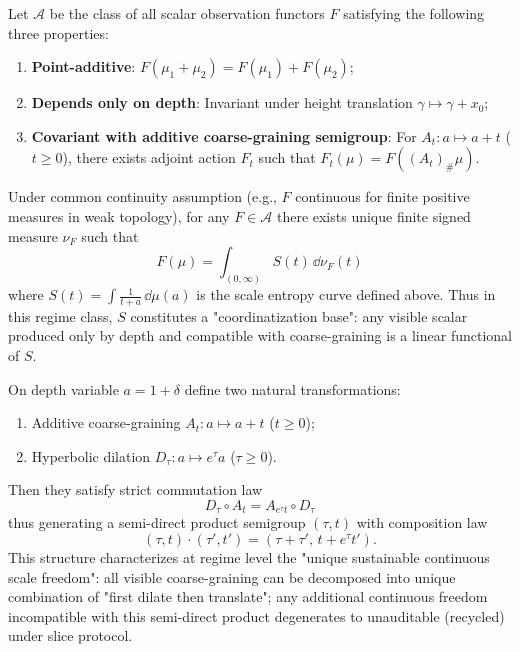 \begin{proposition}
Let \(\mathcal{A}\) be the class of all scalar observation functors \(F\) satisfying the following three properties:
\begin{enumerate}
  \item \textbf{Point-additive}: \(F(\mu_1+\mu_2)=F(\mu_1)+F(\mu_2)\);
  \item \textbf{Depends only on depth}: Invariant under height translation \(\gamma\mapsto\gamma+x_0\);
  \item \textbf{Covariant with additive coarse-graining semigroup}: For \(A_t:a\mapsto a+t\) (\(t\ge0\)), there exists adjoint action \(F_t\) such that \(F_t(\mu)=F((A_t)_\#\mu)\).
\end{enumerate}
Under common continuity assumption (e.g., \(F\) continuous for finite positive measures in weak topology), for any \(F\in\mathcal{A}\) there exists unique finite signed measure \(\nu_F\) such that
\[
\boxed{\;
F(\mu)=\int_{(0,\infty)} S(t)\,\dd\nu_F(t)\;}
\]
where \(S(t)=\int \frac{1}{t+a}\,\dd\mu(a)\) is the scale entropy curve defined above.
Thus in this regime class, \(S\) constitutes a "coordinatization base": any visible scalar produced only by depth and compatible with coarse-graining is a linear functional of \(S\).
\end{proposition}

\begin{proposition}
On depth variable \(a=1+\delta\) define two natural transformations:
\begin{enumerate}
  \item Additive coarse-graining \(A_t:a\mapsto a+t\) (\(t\ge0\));
  \item Hyperbolic dilation \(D_\tau:a\mapsto e^{\tau}a\) (\(\tau\ge0\)).
\end{enumerate}
Then they satisfy strict commutation law
\[
\boxed{\;
D_\tau\circ A_t=A_{e^{\tau}t}\circ D_\tau\;}
\]
thus generating a semi-direct product semigroup \((\tau,t)\) with composition law
\[
(\tau,t)\cdot(\tau',t')=(\tau+\tau',\,t+e^{\tau}t').
\]
This structure characterizes at regime level the "unique sustainable continuous scale freedom": all visible coarse-graining can be decomposed into unique combination of "first dilate then translate"; any additional continuous freedom incompatible with this semi-direct product degenerates to unauditable (recycled) under slice protocol.
\end{proposition}

